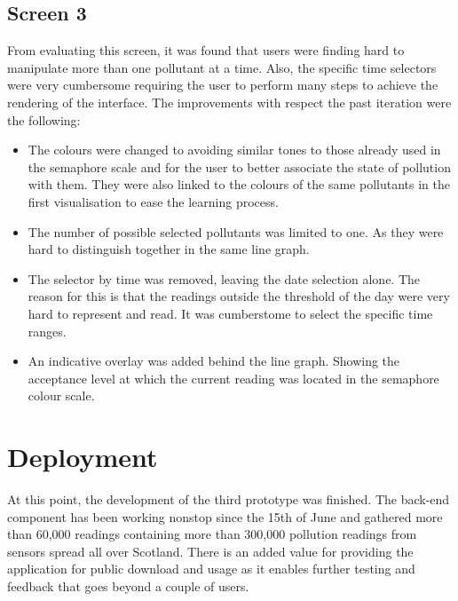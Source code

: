 \subsection{Screen 3}
From evaluating this screen, it was found that users were finding hard to manipulate more than one pollutant at a time. Also, the specific time selectors were very cumbersome requiring the user to perform many steps to achieve the rendering of the interface. 
The improvements with respect the past iteration were the following:
\begin{itemize}
    \item The colours were changed to avoiding similar tones to those already used in the semaphore scale and for the user to better associate the state of pollution with them. They were also linked to the colours of the same pollutants in the first visualisation to ease the learning process.
    \item The number of possible selected pollutants was limited to one. As they were hard to distinguish together in the same line graph. 
    \item The selector by time was removed, leaving the date selection alone. The reason for this is that the readings outside the threshold of the day were very hard to represent and read. It was cumberstome to select the specific time ranges. 
    \item An indicative overlay was added behind the line graph. Showing the acceptance level at which the current reading was located in the semaphore colour scale. 
\end{itemize}

\pagebreak
\section{Deployment}
At this point, the development of the third prototype was finished. The back-end component has been working nonstop since the 15th of June and gathered more than 60,000 readings containing more than 300,000 pollution readings from sensors spread all over Scotland. There is an added value for providing the application for public download and usage as it enables further testing and feedback that goes beyond a couple of users.

